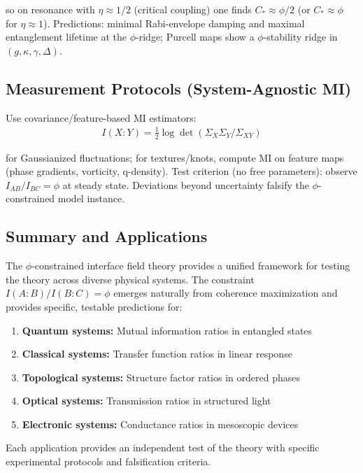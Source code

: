 \documentclass[11pt]{article}
\theoremstyle{definition}
\newcommand{\goldenratio}{\phi}
\begin{document}
so on resonance with $\eta \approx 1/2$ (critical coupling) one finds $C_* \approx \goldenratio/2$ (or $C_* \approx \goldenratio$ for $\eta \approx 1$). Predictions: minimal Rabi-envelope damping and maximal entanglement lifetime at the $\goldenratio$-ridge; Purcell maps show a $\goldenratio$-stability ridge in $(g,\kappa,\gamma,\Delta)$.

\subsection{Measurement Protocols (System-Agnostic MI)}

Use covariance/feature-based MI estimators:
\begin{align}
I(X:Y) = \frac{1}{2} \log \det(\Sigma_X \Sigma_Y / \Sigma_{XY})
\end{align}

for Gaussianized fluctuations; for textures/knots, compute MI on feature maps (phase gradients, vorticity, q-density). Test criterion (no free parameters): observe $I_{AB}/I_{BC} = \goldenratio$ at steady state. Deviations beyond uncertainty falsify the $\goldenratio$-constrained model instance.

\subsection{Summary and Applications}

The $\goldenratio$-constrained interface field theory provides a unified framework for testing the theory across diverse physical systems. The constraint $I(A:B)/I(B:C) = \goldenratio$ emerges naturally from coherence maximization and provides specific, testable predictions for:

\begin{enumerate}
\item \textbf{Quantum systems:} Mutual information ratios in entangled states
\item \textbf{Classical systems:} Transfer function ratios in linear response
\item \textbf{Topological systems:} Structure factor ratios in ordered phases
\item \textbf{Optical systems:} Transmission ratios in structured light
\item \textbf{Electronic systems:} Conductance ratios in mesoscopic devices
\end{enumerate}

Each application provides an independent test of the theory with specific experimental protocols and falsification criteria.
\end{document}
